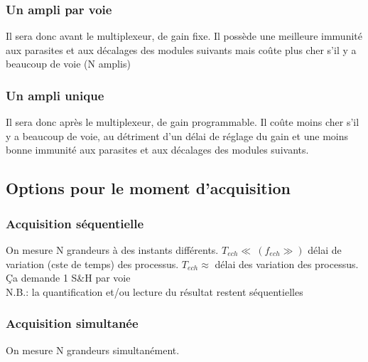\subsubsection{Un ampli par voie}
Il sera donc avant le multiplexeur, de gain fixe. Il possède une meilleure immunité aux parasites et aux décalages des modules suivants mais coûte plus cher s'il y a beaucoup de voie (N amplis)
\subsubsection{Un ampli unique}
Il sera donc après le multiplexeur, de gain programmable. Il coûte moins cher s'il y a beaucoup de voie, au détriment d'un délai de réglage du gain et une moins bonne immunité aux parasites et aux décalages des modules suivants.
\subsection{Options pour le moment d'acquisition}
\subsubsection{Acquisition séquentielle}
On mesure N grandeurs à des instants différents. \(T_{ech}\ll\ (f_{ech}\gg)\) délai de variation (cste de temps) des processus. \(T_{ech}\approx\) délai des variation des processus. Ça demande 1 S\&H par voie\\
N.B.: la quantification et/ou lecture du résultat restent séquentielles
\subsubsection{Acquisition simultanée}
On mesure N grandeurs simultanément. 
